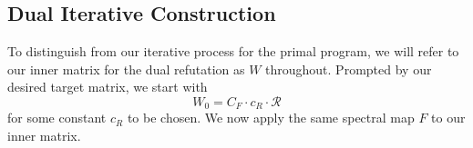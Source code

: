 \documentclass[12pt]{article}
\newcommand{\Var}{\mathrm{Var}}
\newtheorem{definition}[theorem]{Definition}
\newcommand{\calR}{\mathcal{R}}
\newcommand{\calS}{\mathcal{S}}
\newcommand{\gam}{\gamma}
\newcommand{\Authornote}[3]{{\sf\footnotesize\color{#3}{[#1: #2]}}}
\newcommand{\Authornote}[3]{}
\newcommand{\jnote}[1]{\Authornote{Jeff}{#1}{blue}}
\newcommand{\snote}[1]{\Authornote{Sofia}{#1}{orange}}
\begin{document}
\jnote{below is old stuff that is no longer needed i believe...commenting out for now..}

\subsection{Dual Iterative Construction}
\snote{We will refer to our inner matrix for the dual refutation as $W$ to distinguish it from the matrix $Q$ in the primal program.}
To distinguish from our iterative process for the primal program, we will refer to our inner matrix for the dual refutation as $W$ throughout. Prompted by our desired target matrix, we start with \[ 
W_0 = C_F \cdot c_R \cdot \calR 
\]
for some constant $c_R$ to be chosen. We now apply the same spectral map $F$ to our inner matrix. 
\end{document}
